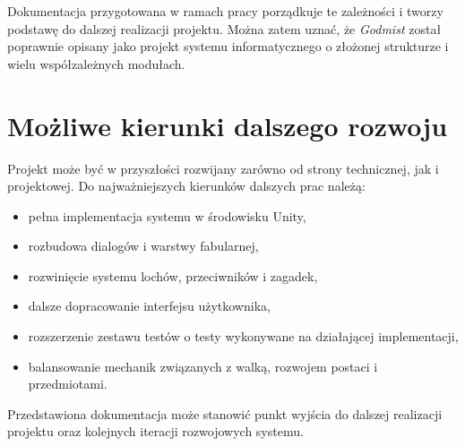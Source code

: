 Dokumentacja przygotowana w ramach pracy porządkuje te zależności i tworzy podstawę do dalszej realizacji projektu. Można zatem uznać, że \emph{Godmist} został poprawnie opisany jako projekt systemu informatycznego o złożonej strukturze i wielu współzależnych modułach.

\section{Możliwe kierunki dalszego rozwoju}
\label{sec:kierunki-dalszego-rozwoju}

Projekt może być w przyszłości rozwijany zarówno od strony technicznej, jak i projektowej. Do najważniejszych kierunków dalszych prac należą:
\begin{itemize}
    \item pełna implementacja systemu w środowisku Unity,
    \item rozbudowa dialogów i warstwy fabularnej,
    \item rozwinięcie systemu lochów, przeciwników i zagadek,
    \item dalsze dopracowanie interfejsu użytkownika,
    \item rozszerzenie zestawu testów o testy wykonywane na działającej implementacji,
    \item balansowanie mechanik związanych z walką, rozwojem postaci i przedmiotami.
\end{itemize}

Przedstawiona dokumentacja może stanowić punkt wyjścia do dalszej realizacji projektu oraz kolejnych iteracji rozwojowych systemu.
